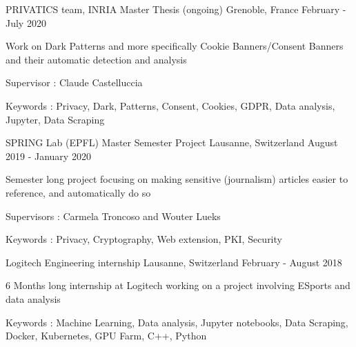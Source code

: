 


\begin{cventries}
	
\cventry
{PRIVATICS team, INRIA} %
{Master Thesis (ongoing)} %
{Grenoble, France} %
{February - July 2020} %
{ %
	\begin{cvitems}
		\item {Work on Dark Patterns and more specifically Cookie Banners/Consent Banners and their automatic detection and analysis}
		\item {Supervisor : Claude Castelluccia}
		\item {Keywords : Privacy, Dark, Patterns, Consent, Cookies, GDPR, Data analysis, Jupyter, Data Scraping}
	\end{cvitems}
}

\cventry
{SPRING Lab (EPFL)} %
{Master Semester Project} %
{Lausanne, Switzerland} %
{August 2019 - January 2020} %
{ %
	\begin{cvitems}
		\item {Semester long project focusing on making sensitive (journalism) articles easier to reference, and automatically do so}
		\item {Supervisors : Carmela Troncoso and Wouter Lueks}
		\item {Keywords : Privacy, Cryptography, Web extension, PKI, Security}
	\end{cvitems}
}

	

\cventry
{Logitech} %
{Engineering internship} %
{Lausanne, Switzerland} %
{February - August 2018} %
{ %
	\begin{cvitems}
		\item {6 Months long internship at Logitech working on a project involving ESports and data analysis}
		\item {Keywords : Machine Learning, Data analysis, Jupyter notebooks, Data Scraping, Docker, Kubernetes, GPU Farm, C++, Python}
	\end{cvitems}
}
	

\end{cventries}
